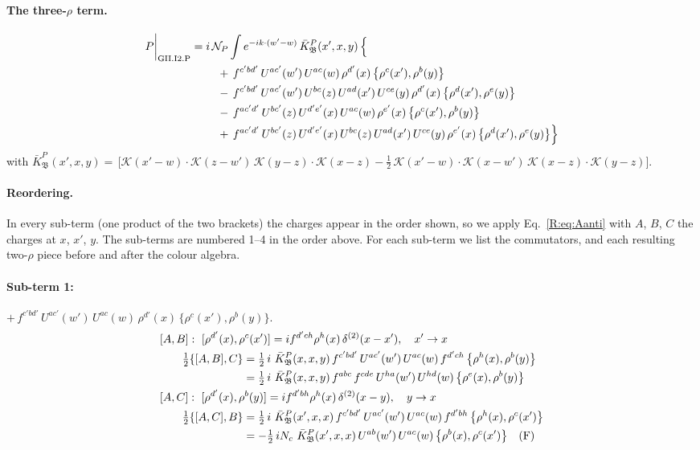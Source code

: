 \documentclass[10pt]{article}
\numberwithin{equation}{section}
\newcommand{\KK}{\mathcal K}
\newcommand{\NP}{\mathcal N_{P}}
\begin{document}
\paragraph{The three-$\rho$ term.}
\begin{align}
P\bigg|_{\rm GII.I2.P}={}&i\,\NP\int e^{-ik\cdot(w'-w)}\,\bar K^{P}_{\mathfrak B}(x',x,y)\,\Big\{\notag\\
&\quad +\,f^{c'bd'}\,U^{ac'}(w')\,U^{ac}(w)\,\rho^{d'}(x)\,\big\{\rho^{c}(x'),\rho^{b}(y)\big\}\notag\\
&\quad -\,f^{c'bd'}\,U^{ac'}(w')\,U^{bc}(z)\,U^{ad}(x')\,U^{ce}(y)\,\rho^{d'}(x)\,\big\{\rho^{d}(x'),\rho^{e}(y)\big\}\notag\\
&\quad -\,f^{ac'd'}\,U^{bc'}(z)\,U^{d'e'}(x)\,U^{ac}(w)\,\rho^{e'}(x)\,\big\{\rho^{c}(x'),\rho^{b}(y)\big\}\notag\\
&\quad +\,f^{ac'd'}\,U^{bc'}(z)\,U^{d'e'}(x)\,U^{bc}(z)\,U^{ad}(x')\,U^{ce}(y)\,\rho^{e'}(x)\,\big\{\rho^{d}(x'),\rho^{e}(y)\big\}\Big\}\label{B:eq:in-GII.I2.P}
\end{align}
with $\bar K^{P}_{\mathfrak B}(x',x,y)=\,\Big[\KK(x'-w)\cdot\KK(z-w')\,\KK(y-z)\cdot\KK(x-z)-\frac{1}{2}\,\KK(x'-w)\cdot\KK(x-w')\,\KK(x-z)\cdot\KK(y-z)\Big]$.
\paragraph{Reordering.} In every sub-term (one product of the two brackets) the charges appear in the order shown, so we apply Eq.~\eqref{R:eq:Aanti} with $A$, $B$, $C$ the charges at $x$, $x'$, $y$. The sub-terms are numbered 1--4 in the order above. For each sub-term we list the commutators, and each resulting two-$\rho$ piece before and after the colour algebra.
\paragraph{Sub-term 1:} $+\,f^{c'bd'}\,U^{ac'}(w')\,U^{ac}(w)\,\rho^{d'}(x)\,\big\{\rho^{c}(x'),\rho^{b}(y)\big\}$.
\begin{align}
&[A,B]:\ [\rho^{d'}(x),\rho^{c}(x')]=i f^{d'ch}\rho^{h}(x)\,\delta^{(2)}(x-x'),\quad x'\to x\notag\\
&\qquad \tfrac12\{[A,B],C\}=\tfrac12\,i\,\,\bar K^{P}_{\mathfrak B}(x,x,y)\,f^{c'bd'}\,U^{ac'}(w')\,U^{ac}(w)\,f^{d'ch}\,\big\{\rho^{h}(x),\rho^{b}(y)\big\}\notag\\
&\qquad\phantom{\tfrac12\{[A,B],C\}}=\tfrac12\,i\,\,\bar K^{P}_{\mathfrak B}(x,x,y)\,f^{abc}\,f^{cde}\,U^{ha}(w')\,U^{hd}(w)\,\big\{\rho^{e}(x),\rho^{b}(y)\big\}
\label{B:eq:GII.I2.P-1-AB}\\
&[A,C]:\ [\rho^{d'}(x),\rho^{b}(y)]=i f^{d'bh}\rho^{h}(x)\,\delta^{(2)}(x-y),\quad y\to x\notag\\
&\qquad \tfrac12\{[A,C],B\}=\tfrac12\,i\,\,\bar K^{P}_{\mathfrak B}(x',x,x)\,f^{c'bd'}\,U^{ac'}(w')\,U^{ac}(w)\,f^{d'bh}\,\big\{\rho^{h}(x),\rho^{c}(x')\big\}\notag\\
&\qquad\phantom{\tfrac12\{[A,C],B\}}=-\tfrac12\,i N_{c}\,\,\bar K^{P}_{\mathfrak B}(x',x,x)\,U^{ab}(w')\,U^{ac}(w)\,\big\{\rho^{b}(x),\rho^{c}(x')\big\}\quad\text{(F)}
\label{B:eq:GII.I2.P-1-AC}
\end{align}
\end{document}
